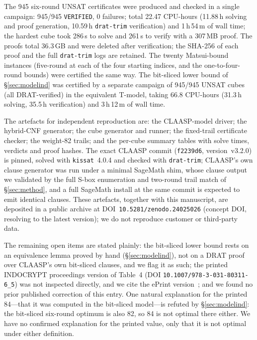 \documentclass[11pt]{article}
\begin{document}
The 945 six-round UNSAT certificates were produced and checked in a single campaign: 945/945 \texttt{VERIFIED}, 0 failures; total 22.47 CPU-hours (11.88\,h solving and proof generation, 10.59\,h \texttt{drat-trim} verification) and 1\,h\,54\,m of wall time; the hardest cube took 286\,s to solve and 261\,s to verify with a 307\,MB proof. The proofs total 36.3\,GB and were deleted after verification; the SHA-256 of each proof and the full \texttt{drat-trim} logs are retained. The twenty Matsui-bound instances (five-round at each of the four starting indices, and the one-to-four-round bounds) were certified the same way. The bit-sliced lower bound of \S\ref{sec:modelind} was certified by a separate campaign of 945/945 UNSAT cubes (all DRAT-verified) in the equivalent T-model, taking 66.8 CPU-hours (31.3\,h solving, 35.5\,h verification) and 3\,h\,12\,m of wall time.

The artefacts for independent reproduction are: the CLAASP-model driver; the hybrid-CNF generator; the cube generator and runner; the fixed-trail certificate checker; the weight-82 trails; and the per-cube summary tables with solve times, verdicts and proof hashes. The exact CLAASP commit (\texttt{f2239d6}, version~v3.2.0) is pinned, solved with \texttt{kissat}~4.0.4 and checked with \texttt{drat-trim}; CLAASP's own clause generator was run under a minimal SageMath shim, whose clause output we validated by the full S-box enumeration and two-round trail match of \S\ref{sec:method}, and a full SageMath install at the same commit is expected to emit identical clauses. These artefacts, together with this manuscript, are deposited in a public archive at DOI~\texttt{10.5281/zenodo.24025026} (concept DOI, resolving to the latest version); we do not reproduce customer or third-party data.

The remaining open items are stated plainly: the bit-sliced lower bound rests on an equivalence lemma proved by hand (\S\ref{sec:modelind}), not on a DRAT proof over CLAASP's own bit-sliced clauses, and we flag it as such; the printed INDOCRYPT proceedings version of Table~4 (DOI \texttt{10.1007/978-3-031-80311-6\_5}) was not inspected directly, and we cite the ePrint version~\cite{claasping}; and we found no prior published correction of this entry. One natural explanation for the printed 84---that it was computed in the bit-sliced model---is refuted by \S\ref{sec:modelind}: the bit-sliced six-round optimum is also 82, so 84 is not optimal there either. We have no confirmed explanation for the printed value, only that it is not optimal under either definition.
\end{document}
